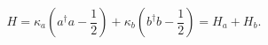 \begin{equation}
\label{hamil2}
H = \kappa_a \left(a^{\dagger}a - \frac{1}{2}\right)+ 
\kappa_b\left(b^{\dagger}b - \frac{1}{2}\right) = H_a + 
H_b.
\end{equation} 
